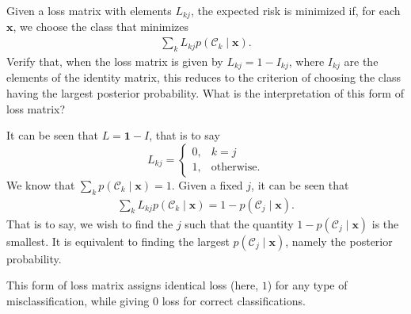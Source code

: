 \begin{question}{1.22}
	Given a loss matrix with elements $L_{kj}$, the expected risk is minimized if, for each $\bm{x}$, we choose the class that minimizes
	\begin{align*}
		\sum_{k} L_{kj}p(\mathcal{C}_k \mid \bm{x}).
	\end{align*}
	Verify that, when the loss matrix is given by $L_{kj} = 1 - I_{kj}$, where $I_{kj}$ are the elements of the identity matrix, this reduces to the criterion of choosing the class having the largest posterior probability. What is the interpretation of this form of loss matrix?
\end{question}

\begin{answer}{}
	It can be seen that $L = \bm{1} - I$, that is to say
	\begin{equation}
		L_{kj} =
		\begin{cases}
			0, & k = j\\
			1, &\mbox{otherwise}.
		\end{cases}
	\end{equation}
	We know that $\sum_{k} p(\mathcal{C}_k \mid \bm{x}) = 1$. Given a fixed $j$, it can be seen that
	\begin{align}
		\sum_{k} L_{kj}p(\mathcal{C}_k \mid \bm{x}) = 1 - p(\mathcal{C}_j \mid \bm{x}).
	\end{align}
	That is to say, we wish to find the $j$ such that the quantity $1 - p(\mathcal{C}_j \mid \bm{x})$ is the smallest. It is equivalent to finding the largest $p(\mathcal{C}_j \mid \bm{x})$, namely the posterior probability.
	
	This form of loss matrix assigns identical loss (here, $1$) for any type of misclassification, while giving $0$ loss for correct classifications.
\end{answer}